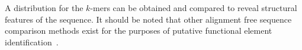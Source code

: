 A distribution for the $k$-mers can be obtained and compared to reveal structural features of the sequence. It should be noted that other alignment free sequence comparison methods exist for the purposes of putative functional element identification~\cite{arunachalam2010alignment, kantorovitz2007statistical, reinert2009alignment, wang2013cpat}. 

